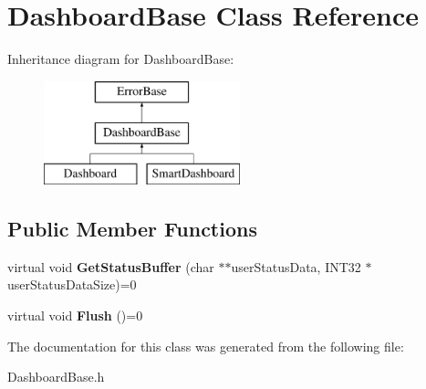 \hypertarget{classDashboardBase}{\section{\-Dashboard\-Base \-Class \-Reference}
\label{classDashboardBase}
}
\-Inheritance diagram for \-Dashboard\-Base\-:\begin{figure}[H]
\begin{center}
\leavevmode
\includegraphics[height=3.000000cm]{classDashboardBase}
\end{center}
\end{figure}
\subsection*{\-Public \-Member \-Functions}
\begin{DoxyCompactItemize}
\item 
\hypertarget{classDashboardBase_a3cecc6b40debb394d33aa7b86b3771bc}{virtual void {\bfseries \-Get\-Status\-Buffer} (char $\ast$$\ast$user\-Status\-Data, \-I\-N\-T32 $\ast$user\-Status\-Data\-Size)=0}\label{classDashboardBase_a3cecc6b40debb394d33aa7b86b3771bc}

\item 
\hypertarget{classDashboardBase_a5b6aa2f259cf4a7e159d94bd7499c21a}{virtual void {\bfseries \-Flush} ()=0}\label{classDashboardBase_a5b6aa2f259cf4a7e159d94bd7499c21a}

\end{DoxyCompactItemize}


\-The documentation for this class was generated from the following file\-:\begin{DoxyCompactItemize}
\item 
\-Dashboard\-Base.\-h\end{DoxyCompactItemize}
